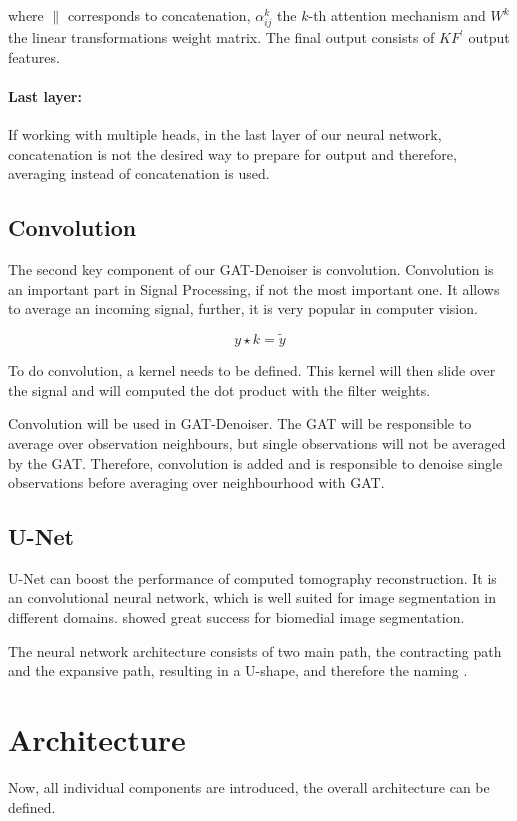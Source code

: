 where $\parallel$ corresponds to concatenation, $\alpha_{ij}^k$ the $k$-th attention mechanism and $W^k$ the linear
transformations weight matrix. The final output consists of $KF^{\prime}$ output features.

\paragraph{Last layer:}
If working with multiple heads, in the last layer of our neural network, concatenation is not the desired 
way to prepare for output and therefore, averaging instead of concatenation is used.

\subsection{Convolution}
The second key component of our GAT-Denoiser is convolution.
Convolution is an important part in Signal Processing, if not the most important one.
It allows to average an incoming signal, further, it is very popular in computer vision.

\begin{equation}
  y \star k = \tilde{y}
\end{equation}

To do convolution, a kernel needs to be defined.
This kernel will then slide over the signal and will computed the dot product with the filter weights.



Convolution will be used in GAT-Denoiser. 
The GAT will be responsible to average over observation neighbours, but single observations will
not be averaged by the GAT. 
Therefore, convolution is added and is responsible to denoise single observations
before averaging over neighbourhood with GAT.

\subsection{U-Net}
U-Net can boost the performance of computed tomography reconstruction.
It is an convolutional neural network, which is well suited for image segmentation in different domains.
\cite{unet-tomography} showed great success for biomedial image segmentation.

The neural network architecture consists of two main path, the contracting path and the expansive path,
resulting in a U-shape, and therefore the naming \cite{unet-tomography}.


\section{Architecture}
Now, all individual components are introduced, the overall architecture can be defined.

